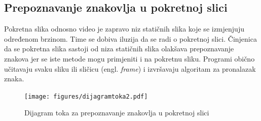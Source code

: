 \subsection{Prepoznavanje znakovlja u pokretnoj slici} %

Pokretna slika odnosno video je zapravo niz statičnih slika 
koje se izmjenjuju određenom brzinom. Time se dobiva iluzija da se 
radi o pokretnoj slici. Činjenica da se pokretna slika sastoji od
niza statičnih slika olakšava prepoznavanje 
znakova jer se iste metode mogu primjeniti i na pokretnu sliku. 
Programi obično učitavaju svaku sliku ili sličicu (engl. \textit{frame}) i izvršavaju algoritam za pronalazak znaka.


\begin{figure}[h]
\centering
\texttt{[image: figures/dijagramtoka2.pdf]}
\caption{Dijagram toka za prepoznavanje znakovlja u pokretnoj slici}
\label{fig:dijagramtoka.pdf}
\end{figure}

